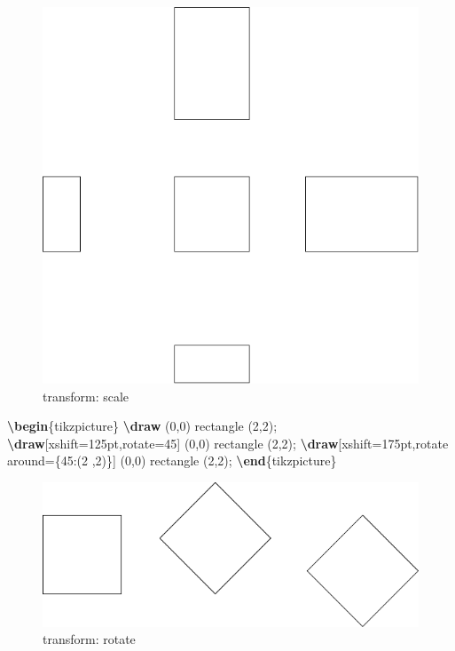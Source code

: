 \documentclass[
]{book}
\newenvironment{Shaded}{\begin{snugshade}}{\end{snugshade}}
\newcommand{\ExtensionTok}[1]{#1}
\newcommand{\FunctionTok}[1]{\textcolor[rgb]{0.13,0.29,0.53}{\textbf{#1}}}
\newcommand{\KeywordTok}[1]{\textcolor[rgb]{0.13,0.29,0.53}{\textbf{#1}}}
\newcommand{\NormalTok}[1]{#1}
\theoremstyle{definition}
\theoremstyle{definition}
\theoremstyle{definition}
\theoremstyle{definition}
\theoremstyle{remark}
\begin{document}
\begin{figure}
\includegraphics[width=0.75\linewidth]{202401311000-TikZ_files/figure-latex/unnamed-chunk-49-1} \caption{transform: scale}\label{fig:unnamed-chunk-49}
\end{figure}

\begin{Shaded}
\begin{Highlighting}[]
\KeywordTok{\textbackslash{}begin}\NormalTok{\{}\ExtensionTok{tikzpicture}\NormalTok{\}}
  \FunctionTok{\textbackslash{}draw}\NormalTok{ (0,0) rectangle (2,2);}
  \FunctionTok{\textbackslash{}draw}\NormalTok{[xshift=125pt,rotate=45] (0,0) rectangle (2,2);}
  \FunctionTok{\textbackslash{}draw}\NormalTok{[xshift=175pt,rotate around=\{45:(2 ,2)\}] (0,0) rectangle (2,2);}
\KeywordTok{\textbackslash{}end}\NormalTok{\{}\ExtensionTok{tikzpicture}\NormalTok{\}}
\end{Highlighting}
\end{Shaded}

\begin{figure}
\includegraphics[width=0.75\linewidth]{202401311000-TikZ_files/figure-latex/unnamed-chunk-51-1} \caption{transform: rotate}\label{fig:unnamed-chunk-51}
\end{figure}
\end{document}

